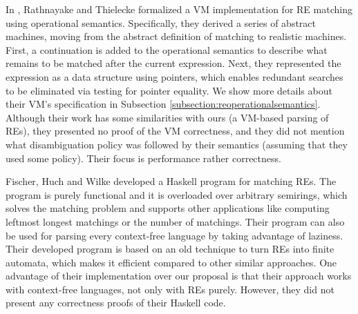 \documentclass[oneside,12pt]{scrbook}
\theoremstyle{definition}
\theoremstyle{plain}
\theoremstyle{definition}
\begin{document}
In \cite{Rathnayake2011}, Rathnayake and Thielecke formalized a VM implementation for RE matching using operational semantics. Specifically, they derived a series of abstract machines, moving from the abstract definition of matching to realistic machines. First, a continuation is added to the operational semantics to describe what remains to be matched after the current expression. Next, they represented the expression as a data structure using pointers, which enables redundant searches to be eliminated via testing for pointer equality. We show more details about their VM's specification in Subsection \ref{subsection:reoperationalsemantics}. Although their work has some similarities with ours (a VM-based parsing of REs), they presented no proof of the VM correctness, and they did not mention what disambiguation policy was followed by their semantics (assuming that they used some policy). Their focus is performance rather correctness.


Fischer, Huch and Wilke \cite{Fischer2010} developed a Haskell program for matching REs. The program is purely functional and it is overloaded over arbitrary semirings, which solves the matching problem and supports other applications like computing leftmost longest matchings or the number of matchings. Their program can also be used for parsing every context-free language by taking advantage of laziness. Their developed program is based on an old technique to turn REs into finite automata, which makes it efficient compared to other similar approaches. One advantage of their implementation over our proposal is that their approach works with context-free languages, not only with REs purely. However, they did not present any correctness proofs of their Haskell code.

\end{document}

